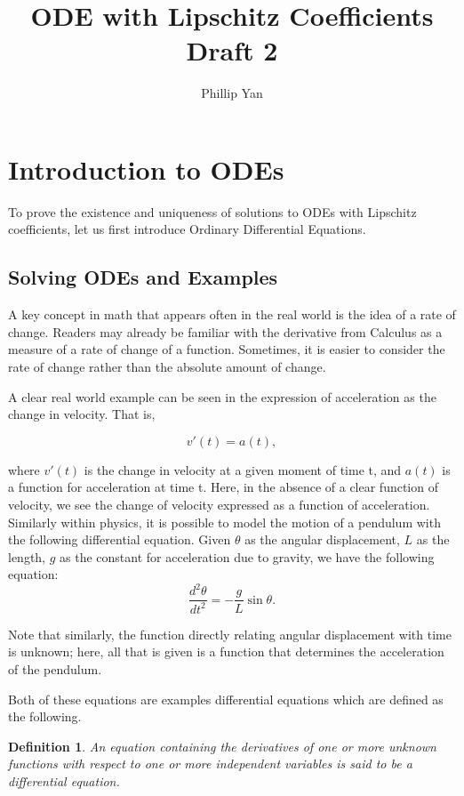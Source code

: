 \documentclass{article}
\date{}
\title{ODE with Lipschitz Coefficients Draft 2}
\author{Phillip Yan}
\newtheorem{definition}{Definition}
\theoremstyle{remark}
\begin{document}
\maketitle



\section{Introduction to ODEs}
To prove the existence and uniqueness of solutions to ODEs with Lipschitz coefficients, let us first introduce Ordinary Differential Equations. \\

\subsection{Solving ODEs and Examples}

A key concept in math that appears often in the real world is the idea of a rate of change. Readers may already be familiar with the derivative from Calculus as a measure of a rate of change of a function. Sometimes, it is easier to consider the rate of change rather than the absolute amount of change.

A clear real world example can be seen in the expression of acceleration as the change in velocity. That is, 

$$v'(t) = a(t),$$

where $v'(t)$ is the change in velocity at a given moment of time t, and $a(t)$ is a function for acceleration at time t. Here, in the absence of a clear function of velocity, we see the change of velocity expressed as a function of acceleration. Similarly within physics, it is possible to model the motion of a pendulum with the following differential equation. Given $\theta$ as the angular displacement, $L$ as the length, $g$ as the constant for acceleration due to gravity, we have the following equation: \\


$$\frac{d^2\theta}{dt^2}  = - \frac{g}{L}\sin{\theta}.$$

Note that similarly, the function directly relating angular displacement with time is unknown; here, all that is given is a function that determines the acceleration of the pendulum.

Both of these equations are examples differential equations which are defined as the following.
\begin{definition} An equation containing the derivatives of one or more unknown functions with respect to one or more independent variables is said to be a differential equation.
\end{definition}
\end{document}
